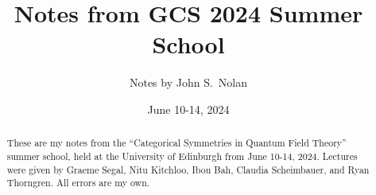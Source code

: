 \documentclass{report}
\title{Notes from GCS 2024 Summer School}
\author{Notes by John S.\ Nolan}
\date{June 10-14, 2024}
\begin{document}
\maketitle

\begin{abstract}
	These are my notes from the ``Categorical Symmetries in Quantum Field Theory'' summer school, held at the University of Edinburgh from June 10-14, 2024.
	Lectures were given by Graeme Segal, Nitu Kitchloo, Ibou Bah, Claudia Scheimbauer, and Ryan Thorngren.
	All errors are my own.
\end{abstract}

\tableofcontents










\end{document}
